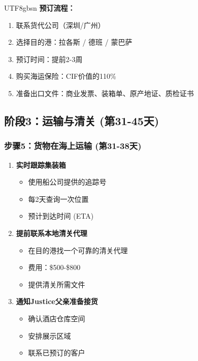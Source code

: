 \documentclass[12pt,a4paper]{article}
\begin{document}
\begin{CJK}{UTF8}{gbsn}
\textbf{预订流程：}
\begin{enumerate}
    \item 联系货代公司（深圳/广州）
    \item 选择目的港：拉各斯 / 德班 / 蒙巴萨
    \item 预订时间：提前2-3周
    \item 购买海运保险：CIF价值的110\%
    \item 准备出口文件：商业发票、装箱单、原产地证、质检证书
\end{enumerate}

\newpage

\subsection{阶段3：运输与清关 (第31-45天)}

\subsubsection{步骤5：货物在海上运输 (第31-38天)}

\begin{enumerate}
    \item \textbf{实时跟踪集装箱}
    \begin{itemize}
        \item 使用船公司提供的追踪号
        \item 每2天查询一次位置
        \item 预计到达时间 (ETA)
    \end{itemize}
    
    \item \textbf{提前联系本地清关代理}
    \begin{itemize}
        \item 在目的港找一个可靠的清关代理
        \item 费用：\$500-\$800
        \item 提供清关所需文件
    \end{itemize}
    
    \item \textbf{通知Justice父亲准备接货}
    \begin{itemize}
        \item 确认酒店仓库空间
        \item 安排展示区域
        \item 联系已预订的客户
    \end{itemize}
\end{enumerate}


\end{CJK}
\end{document}
